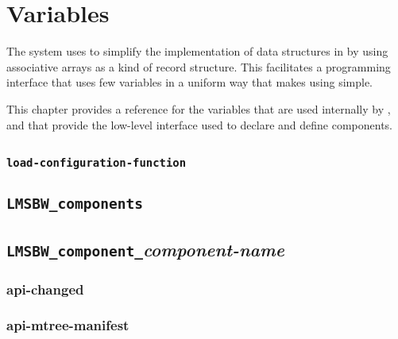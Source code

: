 %
%
%
%
\chapter{Variables}

The \lmsbw system uses \gmsl to simplify the implementation of data
structures in \make by using associative arrays as a kind of record
structure.  This facilitates a programming interface that uses few
variables in a uniform way that makes using \lmsbw simple.

This chapter provides a reference for the variables that are used
internally by \lmsbw, and that provide the low-level interface used to
declare and define components.

\section{\lmsbwconfiguration}
\subsection{\texttt{load-configuration-function}}

\section{\texttt{LMSBW\_components}}

\section{\texttt{LMSBW\_component\_}\emph{component-name}}
\subsection{api-changed}
\subsection{api-mtree-manifest}
